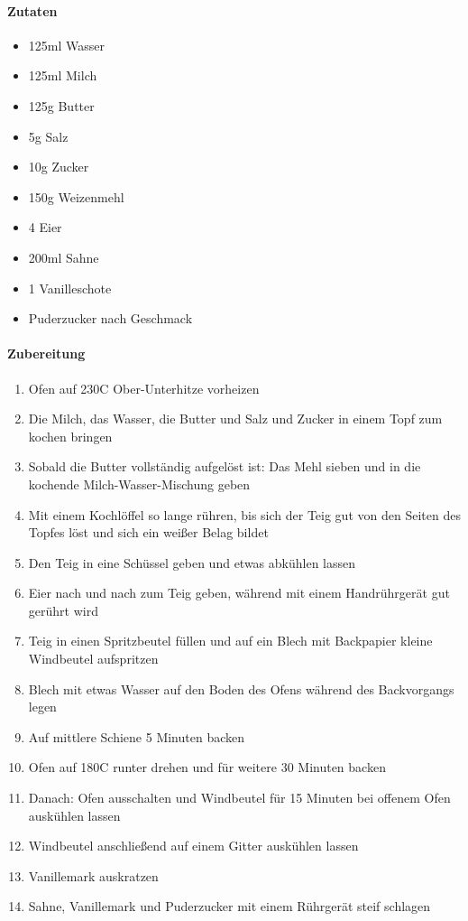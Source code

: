 \newpage
{}
\paragraph{Zutaten}
\begin{itemize}[noitemsep]
	\item 125ml Wasser
	\item 125ml Milch
	\item 125g Butter
	\item 5g Salz
	\item 10g Zucker
	\item 150g Weizenmehl
	\item 4 Eier
	\vspace{0.5cm}
	\item 200ml Sahne
	\item 1 Vanilleschote
	\item Puderzucker nach Geschmack
\end{itemize}


\paragraph{Zubereitung}
\begin{enumerate}[noitemsep]
	\item Ofen auf 230\textdegree C Ober-Unterhitze vorheizen
	\item Die Milch, das Wasser, die Butter und Salz und Zucker in einem Topf zum kochen bringen 
	\item Sobald die Butter vollständig aufgelöst ist: Das Mehl sieben und in die kochende Milch-Wasser-Mischung geben
	\item Mit einem Kochlöffel so lange rühren, bis sich der Teig gut von den Seiten des Topfes löst und sich ein weißer Belag bildet
	\item Den Teig in eine Schüssel geben und etwas abkühlen lassen
	\item  Eier nach und nach zum Teig geben, während mit einem Handrührgerät gut gerührt wird
	\item Teig in einen Spritzbeutel füllen und auf ein Blech mit Backpapier kleine Windbeutel aufspritzen
	\item Blech mit etwas Wasser auf den Boden des Ofens während des Backvorgangs legen
	\item Auf mittlere Schiene 5 Minuten backen
	\item Ofen auf 180\textdegree C runter drehen und für weitere 30 Minuten backen
	\item Danach: Ofen ausschalten und Windbeutel für 15 Minuten bei offenem Ofen auskühlen lassen
	\item Windbeutel anschließend auf einem Gitter auskühlen lassen
	\item Vanillemark auskratzen
	\item Sahne, Vanillemark und Puderzucker mit einem Rührgerät steif schlagen
\end{enumerate}
